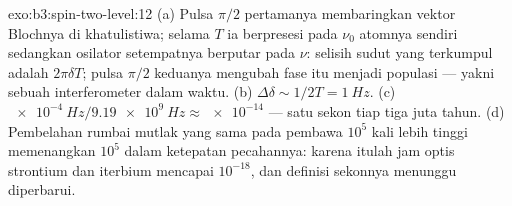 \begin{solution}{exo:b3:spin-two-level:12}
(a) Pulsa $\pi/2$ pertamanya membaringkan vektor Blochnya di
khatulistiwa; selama $T$ ia berpresesi pada $\nu_0$ atomnya sendiri
sedangkan osilator setempatnya berputar pada $\nu$: selisih sudut yang
terkumpul adalah $2\pi\delta T$; pulsa $\pi/2$ keduanya mengubah fase
itu menjadi populasi --- yakni sebuah interferometer dalam waktu. (b)
$\Delta\delta \sim
1/2T = \qty{1}{Hz}$. (c) $\qty{e-4}{Hz}/\qty{9.19e9}{Hz} \approx
\num{e-14}$ --- satu sekon tiap tiga juta tahun. (d) Pembelahan rumbai
mutlak yang sama pada pembawa $10^5$ kali lebih tinggi memenangkan
$10^5$ dalam ketepatan pecahannya: karena itulah jam optis strontium
dan iterbium mencapai $10^{-18}$, dan definisi sekonnya menunggu
diperbarui.
\end{solution}

